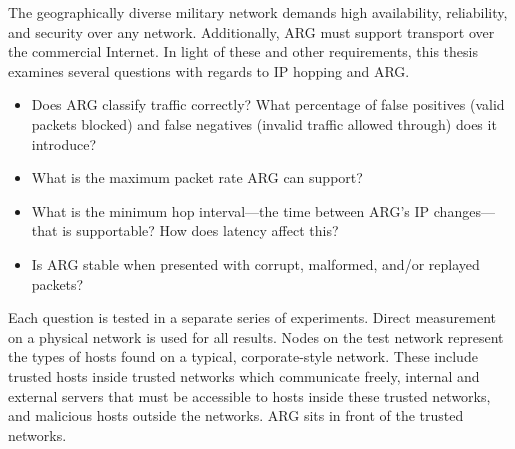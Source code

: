 \par The geographically diverse military network demands high availability, reliability, and security over any network. Additionally, \ac{ARG} must support transport over the commercial Internet. In light of these and other requirements, this thesis examines several questions with regards to \ac{IP} hopping and \ac{ARG}.
\begin{itemize}
	\item Does \ac{ARG} classify traffic correctly? What percentage of false positives (valid packets blocked) and false negatives (invalid traffic allowed through) does it introduce?
	\item What is the maximum packet rate \ac{ARG} can support?
	\item What is the minimum hop interval---the time between ARG's \ac{IP} changes---that is supportable? How does latency affect this?
	\item Is \ac{ARG} stable when presented with corrupt, malformed, and/or replayed packets?
\end{itemize}

\par Each question is tested in a separate series of experiments. Direct measurement on a physical network is used for all results. Nodes on the test network represent the types of hosts found on a typical, corporate-style network. These include trusted hosts inside trusted networks which communicate freely, internal and external servers that must be accessible to hosts inside these trusted networks, and malicious hosts outside the networks. \ac{ARG} sits in front of the trusted networks. 



